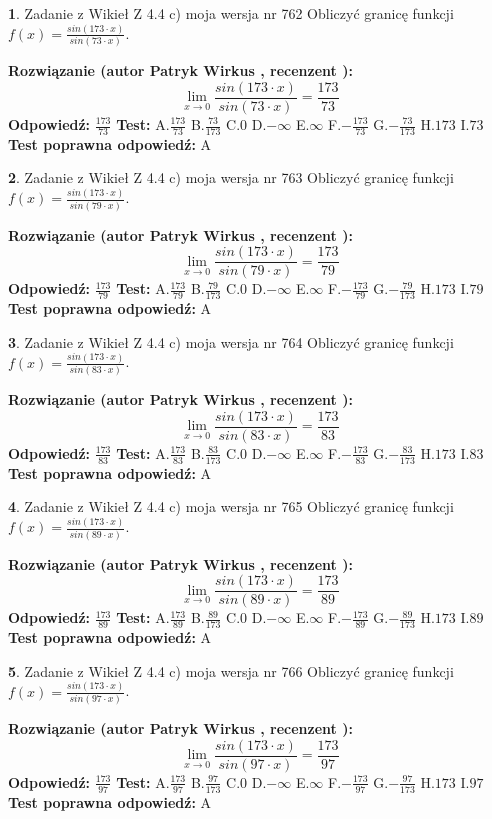 \documentclass[12pt, a4paper]{article}
\theoremstyle{definition} %
\newtheorem{zad}{}
\newcommand{\zadStart}[1]{\begin{zad}#1\newline}
\newcommand{\zadStop}{\end{zad}}
\newcommand{\rozwStart}[2]{\noindent \textbf{Rozwiązanie (autor #1 , recenzent #2): }\newline}
\newcommand{\rozwStop}{\newline}
\newcommand{\odpStart}{\noindent \textbf{Odpowiedź:}\newline}
\newcommand{\odpStop}{\newline}
\newcommand{\testStart}{\noindent \textbf{Test:}\newline}
\newcommand{\testStop}{\newline}
\newcommand{\kluczStart}{\noindent \textbf{Test poprawna odpowiedź:}\newline}
\newcommand{\kluczStop}{\newline}
\begin{document}
\zadStart{Zadanie z Wikieł Z 4.4 c) moja wersja nr 762}
Obliczyć granicę funkcji $f(x)=\frac{sin(173\cdot x)}{sin(73\cdot x)}$.
\zadStop
\rozwStart{Patryk Wirkus}{}
$$\lim\limits_{x\to 0}\frac{sin(173\cdot x)}{sin(73\cdot x)}=
\frac{173}{73}$$
\rozwStop
\odpStart
$\frac{173}{73}$
\odpStop
\testStart
A.$\frac{173}{73}$
B.$\frac{73}{173}$
C.$0$
D.$-\infty$
E.$\infty$
F.$-\frac{173}{73}$
G.$-\frac{73}{173}$
H.$173$
I.$73$
\testStop
\kluczStart
A
\kluczStop



\zadStart{Zadanie z Wikieł Z 4.4 c) moja wersja nr 763}
Obliczyć granicę funkcji $f(x)=\frac{sin(173\cdot x)}{sin(79\cdot x)}$.
\zadStop
\rozwStart{Patryk Wirkus}{}
$$\lim\limits_{x\to 0}\frac{sin(173\cdot x)}{sin(79\cdot x)}=
\frac{173}{79}$$
\rozwStop
\odpStart
$\frac{173}{79}$
\odpStop
\testStart
A.$\frac{173}{79}$
B.$\frac{79}{173}$
C.$0$
D.$-\infty$
E.$\infty$
F.$-\frac{173}{79}$
G.$-\frac{79}{173}$
H.$173$
I.$79$
\testStop
\kluczStart
A
\kluczStop



\zadStart{Zadanie z Wikieł Z 4.4 c) moja wersja nr 764}
Obliczyć granicę funkcji $f(x)=\frac{sin(173\cdot x)}{sin(83\cdot x)}$.
\zadStop
\rozwStart{Patryk Wirkus}{}
$$\lim\limits_{x\to 0}\frac{sin(173\cdot x)}{sin(83\cdot x)}=
\frac{173}{83}$$
\rozwStop
\odpStart
$\frac{173}{83}$
\odpStop
\testStart
A.$\frac{173}{83}$
B.$\frac{83}{173}$
C.$0$
D.$-\infty$
E.$\infty$
F.$-\frac{173}{83}$
G.$-\frac{83}{173}$
H.$173$
I.$83$
\testStop
\kluczStart
A
\kluczStop



\zadStart{Zadanie z Wikieł Z 4.4 c) moja wersja nr 765}
Obliczyć granicę funkcji $f(x)=\frac{sin(173\cdot x)}{sin(89\cdot x)}$.
\zadStop
\rozwStart{Patryk Wirkus}{}
$$\lim\limits_{x\to 0}\frac{sin(173\cdot x)}{sin(89\cdot x)}=
\frac{173}{89}$$
\rozwStop
\odpStart
$\frac{173}{89}$
\odpStop
\testStart
A.$\frac{173}{89}$
B.$\frac{89}{173}$
C.$0$
D.$-\infty$
E.$\infty$
F.$-\frac{173}{89}$
G.$-\frac{89}{173}$
H.$173$
I.$89$
\testStop
\kluczStart
A
\kluczStop



\zadStart{Zadanie z Wikieł Z 4.4 c) moja wersja nr 766}
Obliczyć granicę funkcji $f(x)=\frac{sin(173\cdot x)}{sin(97\cdot x)}$.
\zadStop
\rozwStart{Patryk Wirkus}{}
$$\lim\limits_{x\to 0}\frac{sin(173\cdot x)}{sin(97\cdot x)}=
\frac{173}{97}$$
\rozwStop
\odpStart
$\frac{173}{97}$
\odpStop
\testStart
A.$\frac{173}{97}$
B.$\frac{97}{173}$
C.$0$
D.$-\infty$
E.$\infty$
F.$-\frac{173}{97}$
G.$-\frac{97}{173}$
H.$173$
I.$97$
\testStop
\kluczStart
A
\kluczStop
\end{document}
